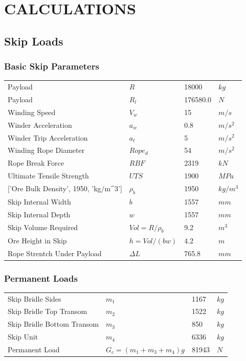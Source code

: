 \documentclass{article}%
\begin{document}
%
\newpage

%
\section{CALCULATIONS}%
\label{sec:CALCULATIONS}%
\subsection{Skip Loads}%
\label{subsec:SkipLoads}%
\subsubsection{Basic Skip Parameters}%
\label{ssubsec:BasicSkipParameters}%
\begin{flushleft}%
\begin{minipage}{\textwidth}%
\flushleft%
\begin{tabular}{l l l l}%
Payload&$R$&18000&$kg$\\%
Payload&$R_l$&176580.0&$N$\\%
Winding Speed&$V_w$&15&$m/s$\\%
Winder Acceleration&$a_w$&0.8&$m/s^2$\\%
Winder Trip Acceleration&$a_t$&5&$m/s^2$\\%
Winding Rope Diameter&$Rope_d$&54&$m/s^2$\\%
Rope Break Force&$RBF$&2319&$kN$\\%
Ultimate Tensile Strength&$UTS$&1900&$MPa$\\%
{[}'Ore Bulk Density', 1950, 'kg/m\^{}3'{]}&$\rho_b$&1950&$kg/m^3$\\%
Skip Internal Width&$b$&1557&$mm$\\%
Skip Internal Depth&$w$&1557&$mm$\\%
Skip Volume Required&$Vol = R / \rho_b$&9.2&$m^3$\\%
Ore Height in Skip&$h = Vol/(b w)$&4.2&$m$\\%
Rope Strentch Under Payload&$\Delta L$&765.8&$mm$\\%
\end{tabular}%
\end{minipage}%
\end{flushleft}

%
\subsubsection{Permanent Loads}%
\label{ssubsec:PermanentLoads}%
\begin{flushleft}%
\begin{minipage}{\textwidth}%
\flushleft%
\begin{tabular}{l l l l}%
Skip Bridle Sides&$m_1$&1167&$kg$\\%
Skip Bridle Top Transom&$m_2$&1522&$kg$\\%
Skip Bridle Bottom Transom&$m_3$&850&$kg$\\%
Skip Unit&$m_4$&6336&$kg$\\%
Permanent Load&$G_c = (m_1 + m_3 + m_4)g$&81943&$N$\\%
\end{tabular}%
\end{minipage}%
\end{flushleft}%
\end{document}
